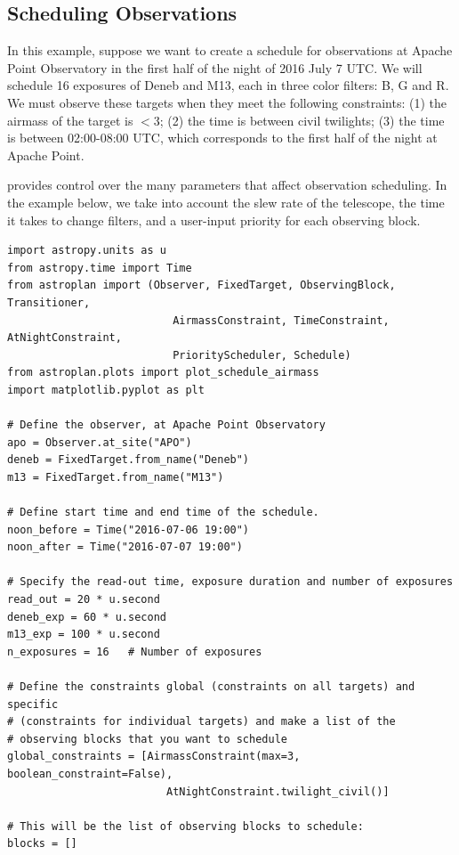\begin{subappendices}
\section{Scheduling Observations} \label{sec:scheduleapp}

In this example, suppose we want to create a schedule for observations at Apache Point Observatory in the first half of the night of 2016 July 7 UTC. We will schedule 16 exposures of Deneb and M13, each in three color filters: B, G and R. We must observe these targets when they meet the following constraints: (1) the airmass of the target is $<3$; (2) the time is between civil twilights; (3) the time is between 02:00-08:00 UTC, which corresponds to the first half of the night at Apache Point.

\astroplan provides control over the many parameters that affect observation scheduling. In the example below, we take into account the slew rate of the telescope, the time it takes to change filters, and a user-input priority for each observing block. 

\begin{lstlisting}
import astropy.units as u
from astropy.time import Time
from astroplan import (Observer, FixedTarget, ObservingBlock, Transitioner,
                          AirmassConstraint, TimeConstraint, AtNightConstraint,
                          PriorityScheduler, Schedule)
from astroplan.plots import plot_schedule_airmass
import matplotlib.pyplot as plt

# Define the observer, at Apache Point Observatory
apo = Observer.at_site("APO")
deneb = FixedTarget.from_name("Deneb")
m13 = FixedTarget.from_name("M13")

# Define start time and end time of the schedule.
noon_before = Time("2016-07-06 19:00")
noon_after = Time("2016-07-07 19:00")

# Specify the read-out time, exposure duration and number of exposures
read_out = 20 * u.second
deneb_exp = 60 * u.second
m13_exp = 100 * u.second
n_exposures = 16   # Number of exposures

# Define the constraints global (constraints on all targets) and specific
# (constraints for individual targets) and make a list of the
# observing blocks that you want to schedule
global_constraints = [AirmassConstraint(max=3, boolean_constraint=False),
                         AtNightConstraint.twilight_civil()]

# This will be the list of observing blocks to schedule:
blocks = []


\end{lstlisting}
\end{subappendices}

